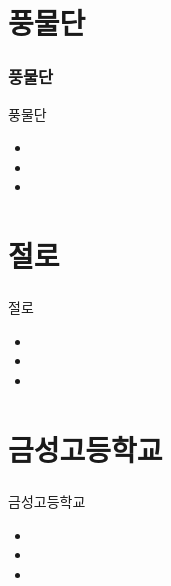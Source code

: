\documentclass[aspectratio=1610,20pt,xcolor=pdftex,dvipsnames,table,handout]{beamer}
\begin{document}
		\section{풍물단}
		\begin{frame} [t,plain]
		\frametitle{풍물단}
			\begin{block} {풍물단}
			\setlength{\leftmargini}{1em}			
			\begin{itemize}
				\item 	\hrulefill
				\item 	\hrulefill
				\item 	\hrulefill
			\end{itemize}
			\end{block}						
		\end{frame}					


		\section{절로}
		\begin{frame} [t,plain]
		\frametitle{}
			\begin{block} {절로}
			\setlength{\leftmargini}{1em}			
			\begin{itemize}
				\item 	\hrulefill
				\item 	\hrulefill
				\item 	\hrulefill
			\end{itemize}
			\end{block}						
		\end{frame}					

		\section{금성고등학교}
		\begin{frame} [t,plain]
		\frametitle{}
			\begin{block} {금성고등학교}
			\setlength{\leftmargini}{1em}			
			\begin{itemize}
				\item 	\hrulefill
				\item 	\hrulefill
				\item 	\hrulefill
			\end{itemize}
			\end{block}						
		\end{frame}					
\end{document}

